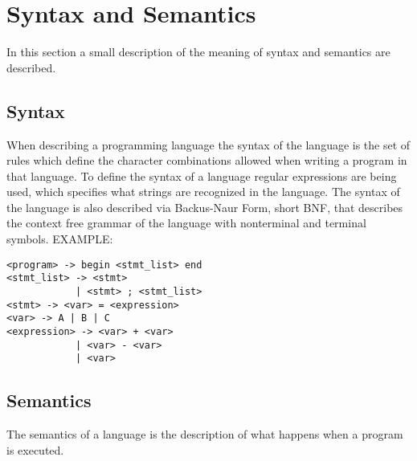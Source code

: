 \section{Syntax and Semantics}
In this section a small description of the meaning of syntax and semantics are described.

\subsection{Syntax}
When describing a programming language the syntax of the language is the set of rules which define the character combinations allowed when writing a program in that language. To define the syntax of a language regular expressions are being used, which specifies what strings are recognized in the language. The syntax of the language is also described via Backus-Naur Form, short BNF, that describes the context free grammar of the language with nonterminal and terminal symbols.
EXAMPLE: \\
\begin{lstlisting}
<program> -> begin <stmt_list> end
<stmt_list> -> <stmt>
			| <stmt> ; <stmt_list>
<stmt> -> <var> = <expression>
<var> -> A | B | C
<expression> -> <var> + <var>
			| <var> - <var>
			| <var>
\end{lstlisting}

\subsection{Semantics}
The semantics of a language is the description of what happens when a program is executed.